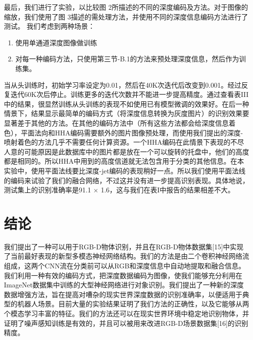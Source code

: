 最后，我们进行了实验，以比较图 2所描述的不同的深度编码及方法。对于图像的缩放，我们使用了图 3描述的需处理方法，并使用不同的深度信息编码方法进行了测试。
我们考虑到两种场景：
\begin{enumerate}
\item 使用单通道深度图像做训练
\item 对每一种编码方法，只使用第三节-B.1的方法来预处理深度信息，然后作为训练集。
\end{enumerate}
当从头训练时，初始学习率设定为0.01，然后在40K次迭代后改变到0.001。经过反复迭代60K次后停止。训练更多的迭代次数并不能进一步提高精度。通过查看表III中的结果，很显然训练从头训练的表现不如使用已有模型微调的效果好。在后一种情景下，结果显示最简单的编码方式（将深度信息转换为灰度图片）的识别效果要显著差于其他的方法。在其他的编码方法中（所有这些方法都会给深度信息着色），平面法向和HHA编码需要额外的图片图像预处理，而使用我们提出的深度-喷射着色的方法几乎不需要任何计算资源。一个HHA编码在此情景下表现的不尽人意的可能原因是此数据库中的图片都是放在一个可以旋转的托盘中，他们的高度都是相同的。所以HHA中用到的高度信道就无法包含用于分类的其他信息。在本实验中，使用平面法线要比深度-jet编码的表现稍好一点。所以我们使用平面法线的编码来试验了我们的融合网络，不过这并没有进一步提高识别表现。具体地说，测试集上的识别准确率是91.1 $\times$ 1.6，这与我们在表I中报告的结果相差不大。

\section{结论}

我们提出了一种可以用于RGB-D物体识别，并且在RGB-D物体数据集[15]中实现了当前最好表现的新型多模态神经网络结构。我们的方法是由二个卷积神经网络流组成，这两个CNN流在分类前可以从RGB和深度信息中自动地提取和融合信息。我们利用一种有效的编码方式，把深度数据编码为图像，使我们能够充分利用在ImageNet数据集中训练的大型神经网络进行对象识别。我们提出了一种新的深度数据增强方法，旨在提高对嘈杂的现实世界深度数据的识别准确率，以便适用于典型的机器人场景。目前大量的实验结果证明了我们方法的正确性，以及它能够从两个模态学习丰富的特征。我们的方法还可以在现实世界环境中稳定地识别物体，并证明了噪声感知训练是有效的，并且可以被用来改进RGB-D场景数据集[16]的识别精度。